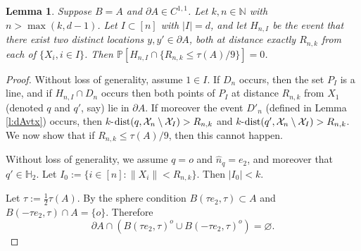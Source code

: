 \documentclass[12pt]{article}
\newcommand{\N}{\mathbb{N}}
\renewcommand{\Pr}{\mathbb{P}}
\newcommand{\X}{\mathcal{X}}
\newcommand{\dist}{{\rm dist}}
\newtheorem{lemm}{Lemma}
\begin{document}
\begin{lemm}
	\label{l:Hn}
	Suppose $B=A$ and $\partial A \in C^{1,1}$.
	Let $k,n \in \N$ with $n > \max(k,d-1)$.
	  Let $I \subset [n]$ with $|I|=d$, and let
	$H_{n,I}$ be the event that
	  there exist two distinct locations $y, y' \in  
	  \partial A $, both at distance exactly $R_{n,k}$ from each of
	  $\{X_i, i \in I\}$.  Then 
	$\Pr[H_{n,I} \cap \{R_{n,k} \leq \tau(A)/9\}] = 0$.
\end{lemm}
\begin{proof}
	Without loss of generality, assume $1 \in I$. 
	If $D_n$ occurs, then  the set $P_I$ is a line, 
and if $H_{n,I} \cap D_n$ occurs then both points of $P_I$ at distance $R_{n,k}$
from $X_1$ (denoted $q$ and $q'$, say) 
lie in $\partial A$.
If moreover the event $D'_n$ 
	(defined in Lemma \ref{l:dAvtx})
	occurs, then
$k$-$\dist (q,\X_n \setminus \X_I) > R_{n,k}$ and
$k$-$\dist (q',\X_n \setminus \X_I) > R_{n,k}$.
We now show that if $R_{n,k} \leq \tau(A)/9$, then this cannot happen. 

Without loss of generality,  we assume $q=o$ and $\hat{n}_q = e_2$,
and moreover that $q' \in \mathbb H_2$.
	Let $I_0 := \{i \in [n]: \|X_i\| < R_{n,k}\}.$ Then
$|I_0 | < k$.

Let $\tau := \frac12 \tau(A)$.
          By the sphere condition
	  $B(\tau e_2,\tau) \subset A$ and $B(-\tau e_2, \tau) \cap A
	  = \{o\}$. Therefore %
          $$
	  \partial A %
	  \cap (B(\tau e_2,\tau)^o
          \cup B(-\tau e_2,\tau)^o) = \varnothing.
          $$


\end{proof}
\end{document}
